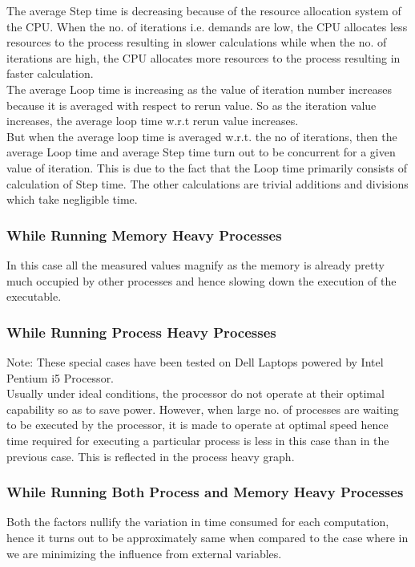\documentclass[11pt]{article}
\begin{document}
The average Step time is decreasing because of the resource allocation system of the CPU. When the no. of iterations i.e. demands are low, the CPU allocates less resources to the process resulting in slower calculations while when the no. of iterations are high, the CPU allocates more resources to the process resulting in faster calculation.
\cite{hunter13}
\\
The average Loop time is increasing as the value of iteration number increases because it is averaged with respect to rerun value. So as the iteration value increases, the average loop time w.r.t rerun value increases.
\\
But when the average loop time is averaged w.r.t. the no of iterations, then the average Loop time and average Step time turn out to be concurrent for a given value of iteration. This is due to the fact that the Loop time primarily consists of calculation of Step time. The other calculations are trivial additions and divisions which take negligible time.
 

\subsubsection{While Running Memory Heavy Processes}
In this case all the measured values magnify as the memory is already pretty much occupied by other processes and hence slowing down the execution of the executable.
\subsubsection{While Running Process Heavy Processes}
Note: These special cases have been tested on Dell Laptops powered by Intel Pentium i5 Processor.
\\
Usually under ideal conditions, the processor do not operate at their optimal capability so as to save power. However, when large no. of processes are waiting to be executed by the processor, it is made to operate at optimal speed hence time required for executing a particular process is less in this case than in the previous case. This is reflected in the process heavy graph.
\subsubsection{While Running Both Process and Memory Heavy Processes}
Both the factors nullify the variation in time consumed for each computation, hence it turns out to be approximately same when compared to the case where in we are minimizing the influence from external variables.
\end{document}
